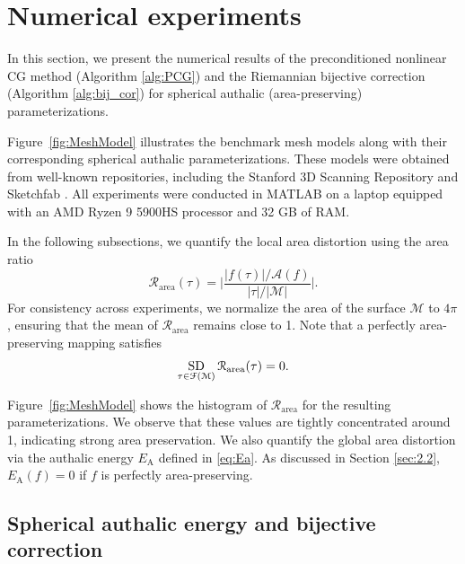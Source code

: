 \documentclass{article}
\numberwithin{equation}{section}
\def\rA{\mathrm{A}}
\def\A{\mathcal{A}}
\def\F{\mathcal{F}}
\def\M{\mathcal{M}}
\newcommand{\SD}{\operatornamewithlimits{SD}}
\begin{document}
\section{Numerical experiments}
\label{sec:6}
In this section, we present the numerical results of the preconditioned nonlinear CG method (Algorithm \ref{alg:PCG}) and the Riemannian bijective correction (Algorithm \ref{alg:bij_cor}) for spherical authalic (area-preserving) parameterizations.

Figure~\ref{fig:MeshModel} illustrates the benchmark mesh models along with their corresponding spherical authalic parameterizations. These models were obtained from well-known repositories, including the Stanford 3D Scanning Repository \cite{Stanford} and Sketchfab \cite{Sketchfab}. All experiments were conducted in MATLAB on a laptop equipped with an AMD Ryzen 9 5900HS processor and 32 GB of RAM.

In the following subsections, we quantify the local area distortion using the area ratio
\begin{equation}
    \mathcal{R}_\mathrm{area}(\tau) =  \bigg| \frac{|f(\tau)| / \A(f) }{|\tau| / |\M|} \bigg|.
\label{eq:Area_dist}
\end{equation}
For consistency across experiments, we normalize the area of the surface $\M$ to $4\pi$, ensuring that the mean of $\mathcal{R}_\mathrm{area}$ remains close to 1. Note that a perfectly area-preserving mapping satisfies
$$
\SD_{\tau \in \F(\M)} \mathcal{R}_\mathrm{area}(\tau) = 0.
$$

Figure~\ref{fig:MeshModel} shows the histogram of $\mathcal{R}_\mathrm{area}$ for the resulting parameterizations. We observe that these values are tightly concentrated around 1, indicating strong area preservation.
We also quantify the global area distortion via the authalic energy $E_\rA$ defined in \eqref{eq:Ea}. As discussed in Section \ref{sec:2.2}, $E_\rA(f) = 0$ if $f$ is perfectly area-preserving.

\subsection{Spherical authalic energy and bijective correction}
\label{sec:6.1}
\end{document}
